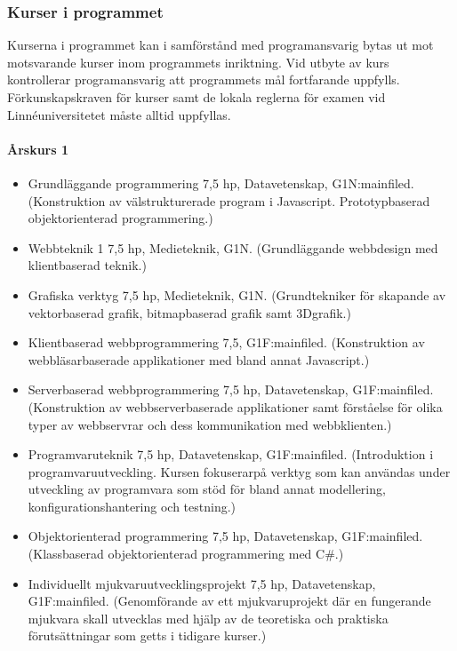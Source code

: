\documentclass[swedish]{LnuCmThesis}
\begin{document}
\subsubsection*{Kurser i programmet}

Kurserna i programmet kan i samförstånd med programansvarig bytas ut mot
motsvarande kurser inom programmets inriktning. Vid utbyte av kurs kontrollerar
programansvarig att programmets mål fortfarande uppfylls. Förkunskapskraven för
kurser samt de lokala reglerna för examen vid Linnéuniversitetet måste alltid uppfyllas.

\paragraph*{Årskurs 1}

\begin{itemize}
    \item Grundläggande programmering 7,5 hp, Datavetenskap, G1N\fn:mainfiled{}. (Konstruktion av välstrukturerade program i Javascript. Prototypbaserad objektorienterad programmering.)
    \item Webbteknik 1 7,5 hp, Medieteknik, G1N. (Grundläggande webbdesign med klientbaserad teknik.)
    \item Grafiska verktyg 7,5 hp, Medieteknik, G1N. (Grundtekniker för skapande av vektorbaserad grafik, bitmapbaserad grafik samt 3D­grafik.)
    \item Klientbaserad webbprogrammering 7,5, G1F\fn:mainfiled{}. (Konstruktion av webbläsarbaserade applikationer med bland annat Javascript.)
    \item Serverbaserad webbprogrammering 7,5 hp, Datavetenskap, G1F\fn:mainfiled{}. (Konstruktion av webbserverbaserade applikationer samt förståelse för olika typer av webbservrar och dess kommunikation med webbklienten.)
    \item Programvaruteknik 7,5 hp, Datavetenskap, G1F\fn:mainfiled{}. (Introduktion i programvaruutveckling. Kursen fokuserarpå verktyg som kan användas under utveckling av programvara som stöd för bland annat modellering, konfigurationshantering och testning.)
    \item Objektorienterad programmering 7,5 hp, Datavetenskap, G1F\fn:mainfiled{}. (Klassbaserad objektorienterad programmering med C\#.)
    \item Individuellt mjukvaruutvecklingsprojekt 7,5 hp, Datavetenskap, G1F\fn:mainfiled{}. (Genomförande av ett mjukvaruprojekt där en fungerande mjukvara skall utvecklas med hjälp av de teoretiska och praktiska förutsättningar som getts i tidigare kurser.)
\end{itemize}
\end{document}
